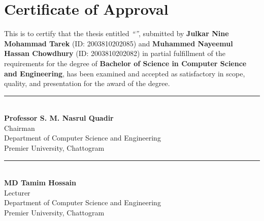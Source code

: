 \chapter*{Certificate of Approval}

This is to certify that the thesis entitled \textit{``\projecttitle''},
submitted by \textbf{Julkar Nine Mohammad Tarek} (ID: 2003810202085) and
\textbf{Muhammed Nayeemul Hassan Chowdhury} (ID: 2003810202082) in partial
fulfillment of the requirements for the degree of \textbf{Bachelor of
Science in Computer Science and Engineering}, has been examined and
accepted as satisfactory in scope, quality, and presentation for the
award of the degree.

\vspace{2.5cm}

\noindent
\rule{0.45\linewidth}{0.4pt}\\
\textbf{Professor S. M. Nasrul Quadir}\\
Chairman\\
Department of Computer Science and Engineering\\
Premier University, Chattogram\\

\vspace{2.5cm}

\noindent
\rule{0.45\linewidth}{0.4pt}\\
\textbf{MD Tamim Hossain}\\
Lecturer\\
Department of Computer Science and Engineering\\
Premier University, Chattogram\\

\clearpage